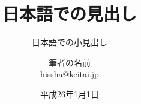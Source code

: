 \documentclass[dvipdfmx,aspectratio=43]{beamer}
\begin{document}
\title{日本語での見出し}
\subtitle{日本語での小見出し}
\author{筆者の名前\\hissha@keitai.jp}
\date{平成26年1月1日}

\frame[plain]{\maketitle}
\end{document}
